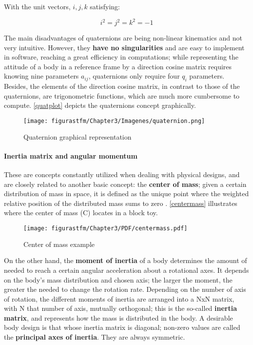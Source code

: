 With the unit vectors, $i, j, k$ satisfying:

\begin{equation} 
i^{2}=j^{2}=k^{2}=-1
\end{equation}


The main disadvantages of quaternions are being non-linear kinematics and not very intuitive. However, they \textbf{have no singularities} and are easy to implement in software, reaching a great efficiency in computations; while representing the attitude of a body in a reference frame by a direction cosine matrix requires knowing nine parameters $a_{ij}$, quaternions only require four $q_{i}$ parameters. Besides, the elements of the direction cosine matrix, in contrast to those of the quaternions, are trigonometric functions, which are much more cumbersome to compute. \autoref{quatplot} depicts the quaternions concept graphically.

			\begin{figure}[H]
				\centering
				\texttt{[image: figurastfm/Chapter3/Imagenes/quaternion.png]}
				\caption{Quaternion graphical representation \cite{euclidean}}
				\label{quatplot}
			\end{figure}
			
\paragraph{Inertia matrix and angular momentum}\label{imatrix}

These are concepts constantly utilized when dealing with physical designs, and are closely related to another basic concept: the \textbf{center of mass}; given a certain distribution of mass in space, it is defined as the unique point where the weighted relative position of the distributed mass sums to zero \cite{wiki}. \autoref{centermass} illustrates where the center of mass (C) locates in a block toy.

	\begin{figure}[H]
				\centering
				\texttt{[image: figurastfm/Chapter3/PDF/centermass.pdf]}
				\caption{Center of mass example \cite{wiki}}
				\label{centermass}
			\end{figure}
			
			On the other hand, the \textbf{moment of inertia} of a body determines the amount of  needed to reach a certain angular acceleration about a rotational axes. It depends on the body's mass distribution and chosen axis; the larger the moment, the greater the  needed to change the rotation rate. Depending on the number of axis of rotation, the different moments of inertia are arranged into a NxN matrix, with N that number of axis, mutually orthogonal; this is the so-called \textbf{inertia matrix}, and represents how the mass is distributed in the body. A desirable body design is that whose inertia matrix is diagonal; non-zero values are called the \textbf{principal axes of inertia}. They are always symmetric.
			

